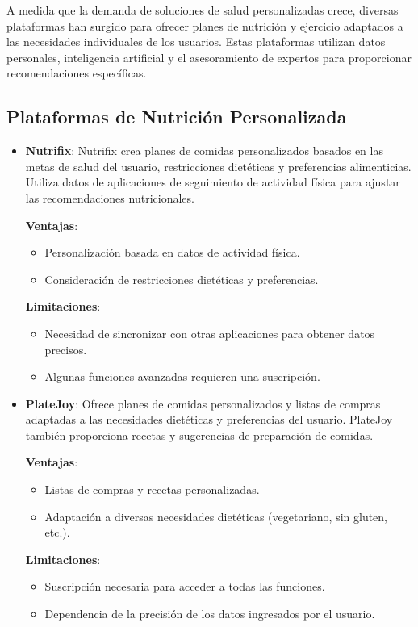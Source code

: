 A medida que la demanda de soluciones de salud personalizadas crece, diversas plataformas han surgido para ofrecer planes de nutrición y ejercicio adaptados a las necesidades individuales de los usuarios. Estas plataformas utilizan datos personales, inteligencia artificial y el asesoramiento de expertos para proporcionar recomendaciones específicas.

\subsection{Plataformas de Nutrición Personalizada}

\begin{itemize}
  \item \textbf{Nutrifix}: Nutrifix crea planes de comidas personalizados basados en las metas de salud del usuario, restricciones dietéticas y preferencias alimenticias. Utiliza datos de aplicaciones de seguimiento de actividad física para ajustar las recomendaciones nutricionales.

    \textbf{Ventajas}:
    \begin{itemize}
      \item Personalización basada en datos de actividad física.
      \item Consideración de restricciones dietéticas y preferencias.
    \end{itemize}

    \textbf{Limitaciones}:
    \begin{itemize}
      \item Necesidad de sincronizar con otras aplicaciones para obtener datos precisos.
      \item Algunas funciones avanzadas requieren una suscripción.
    \end{itemize}

  \item \textbf{PlateJoy}: Ofrece planes de comidas personalizados y listas de compras adaptadas a las necesidades dietéticas y preferencias del usuario. PlateJoy también proporciona recetas y sugerencias de preparación de comidas.

    \textbf{Ventajas}:
    \begin{itemize}
      \item Listas de compras y recetas personalizadas.
      \item Adaptación a diversas necesidades dietéticas (vegetariano, sin gluten, etc.).
    \end{itemize}

    \textbf{Limitaciones}:
    \begin{itemize}
      \item Suscripción necesaria para acceder a todas las funciones.
      \item Dependencia de la precisión de los datos ingresados por el usuario.
    \end{itemize}
\end{itemize}

